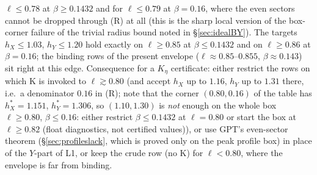 $\ell\le0.78$ at $\beta\ge0.1432$ and for $\ell\le0.79$ at $\beta=0.16$, where the even sectors cannot be dropped through (R) at all (this is the sharp local version of the box-corner failure of
the trivial radius bound noted in \S\ref{sec:idealBY}). The targets $h_X\le1.03$, $h_Y\le1.20$ hold exactly on $\ell\ge0.85$ at $\beta\le0.1432$ and on $\ell\ge0.86$ at $\beta=0.16$; the binding rows
of the present envelope ($\ell\approx0.85$--$0.855$, $\beta\approx0.143$) sit right at this edge. Consequence for a $K_\eta$ certificate: either restrict the rows on which K is invoked to
$\ell\gtrsim0.80$ (and accept $h_X$ up to $1.16$, $h_Y$ up to $1.31$ there, i.e.\ a denominator $0.16$ in (R); note that the corner $(0.80,0.16)$ of the table has $h_X^*=1.151$, $h_Y^*=1.306$, so $(1.10,1.30)$ is \emph{not} enough on the whole box $\ell\ge0.80$, $\beta\le0.16$: either restrict $\beta\le0.1432$ at $\ell=0.80$ or start the box at $\ell\ge0.82$ (float diagnostics, not certified values)), or use GPT's even-sector theorem (\S\ref{sec:profileslack}, which is proved only
on the peak profile box) in place of the $Y$-part of L1, or keep the crude row (no K) for $\ell<0.80$, where the envelope is far from binding.

